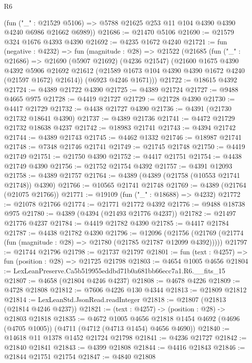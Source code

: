 \begin{lexlean}{R6}
\begin{coremodule}
      (fun ("_" : @21529 @5106) => @5788 @21625 @253 @11 @104 @4390 @4390 @4240 @6986 @21662 @6989))
@21686 := @21470 @5106
@21690 := @21579 @324 @1676 @4393 @4390
@21692 := @4235 @1672 @4240
@21721 := fun (negative : @4232) =>
  fun (magnitude : @28) =>
  @21522
    (@21685
      (fun ("_" : @21686) =>
      @21690
        (@5907 @21692)
        (@4236 @21547)
        (@21600
          @1675
          @4390
          @4392
          @5906
          @21692
          @21612
          (@21589 @1673 @104 @4390 @4390 @1672 @4240 (@21597 @1672) @21614))
        (@6923 @4246 @1671)))
@21722 := @18615 @4392
@21724 := @4389 @21722 @4390
@21725 := @4389 @21724
@21727 := @9488 @4665 @975
@21728 := @4419 @21727
@21729 := @21728 @4390
@21730 := @4417 @21729
@21732 := @4438 @21727 @4390
@21736 := @4391 (@21730 @21732 @18641 @4390)
@21737 := @4389 @21736
@21741 := @4472 @21729 @21732 @18638 @4237
@21742 := @18983 @21741
@21743 := @4394 @21742
@21744 := @4389 @21743
@21745 := @4462 @1332
@21746 := @18987 @21741
@21748 := @7348 @21746 @21741
@21749 := @21745 @21748
@21750 := @4419 @21749
@21751 := @21750 @4390
@21752 := @4417 @21751
@21754 := @4438 @21749 @4390
@21756 := @21752 @21754 @4392
@21757 := @4391 @12093
@21758 := @4389 @21757
@21764 := @4389 (@4389 (@21758 (@10553 @21741 @21748)) @4390)
@21766 := @10565 @21741 @21748
@21769 := @4389 (@21764 (@21075 @21766))
@21771 := @19109 (fun ("_" : @18688) => @4232)
@21772 := @21078 @21766
@21774 := @21771 @21772 @4392
@21776 := @9488 @18738 @975
@21780 := @4389 (@4394 (@21493 @21776 @4237))
@21782 := @21497 @21776 @4237
@21784 := @4419 @21782 @4390
@21785 := @4417 @21784
@21787 := @4438 @21782 @4390
@21796 := @12096
    (@21756 (@21769 (@21774 (fun (magnitude : @28) => @21780 (@21785 @21787 @12099 @4392)))))
@21797 := @21744 @21796
@21798 := @21737 @21797
@21801 := fun (text : @4257) => fun (position : @28) => @21725 @21798
@21803 := @4654 @1005 @4656
@21804 := LexLeanPreserve.Ca5b519955eddbd71b0a681bb66ecc7a1.R6.__fits_15
@21807 := @4658 (@21804 @4246 @4237)
@21808 := @4678 @4226
@21809 := @4728 @21808
@21812 := @7606 @4226 @130 @4344
@21813 := @21809 @21812
@21814 := LexLeanStd.JsonRead.readInteger
@21818 := @21807 (@21813 (@21814 @4246 @4237))
@21821 := (text : @4257) -> (position : @28) -> @21803 @21818
@21835 := @4672
    @1005
    @4656
    @21818
    @1454
    @4692
    (@4696 (@4705 @1005))
    (@4711 (@4712 (@4713 @1454) @4656 @4690))
@21840 := @14618 @11 @1378 @1452 @21724 @21798
@21841 := @4236 @21727
@21842 := @21840 @21841
@21843 := @4399 @21808
@21844 := @4416 @21843
@21846 := @21844 @21751 @21754
@21847 := @4840 @21808

\end{coremodule}
\end{lexlean}
